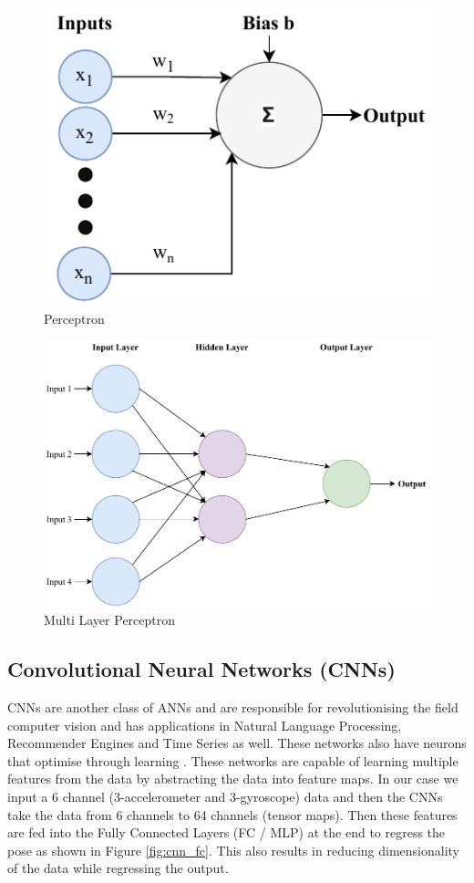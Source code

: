 \begin{figure}[H]
    \centering
    \includegraphics[scale=0.75]{images/fig_chapter2/nns/perceptron.pdf}
    \caption{Perceptron}
    \label{fig:perceptron}
\end{figure}

\begin{figure}[H]
    \centering
    \includegraphics[scale=0.6]{images/fig_chapter2/nns/mlp.pdf}
    \caption{Multi Layer Perceptron}
    \label{fig:mlp}
\end{figure}

\subsection{Convolutional Neural Networks (CNNs)}
CNNs are another class of ANNs and are responsible for revolutionising the field computer vision and has applications in Natural Language Processing, Recommender Engines and Time Series as well. These networks also have neurons that optimise through learning \citep{cnn2015introduction}. These networks are capable of learning multiple features from the data by abstracting the data into feature maps. In our case we input a 6 channel (3-accelerometer and 3-gyroscope) data and then the CNNs take the data from 6 channels to 64 channels (tensor maps). Then these features are fed into the Fully Connected Layers (FC / MLP) at the end to regress the pose as shown in Figure \ref{fig:cnn_fc}. This also results in reducing dimensionality of the data while regressing the output. 

